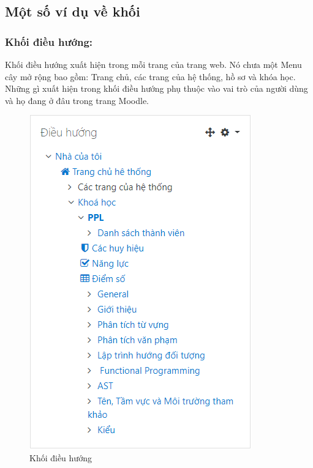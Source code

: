 \subsection{Một số ví dụ về khối}
\subsubsection{Khối điều hướng:}
Khối điều hướng xuất hiện trong mỗi trang của trang web. Nó chưa một Menu cây mở rộng bao gồm: Trang chủ, các trang của hệ thống, hồ sơ và khóa học. Những gì xuất hiện trong khối điều hướng phụ thuộc vào vai trò của người dùng và họ đang ở đâu trong trang Moodle.
\begin{center}
	\begin{figure}[htp]
		\begin{center}
			\includegraphics[scale=0.6]{img/khoidieuhuong}
		\end{center}
		\caption{Khối điều hướng}
		\label{refhinh5}
	\end{figure}
\end{center}

